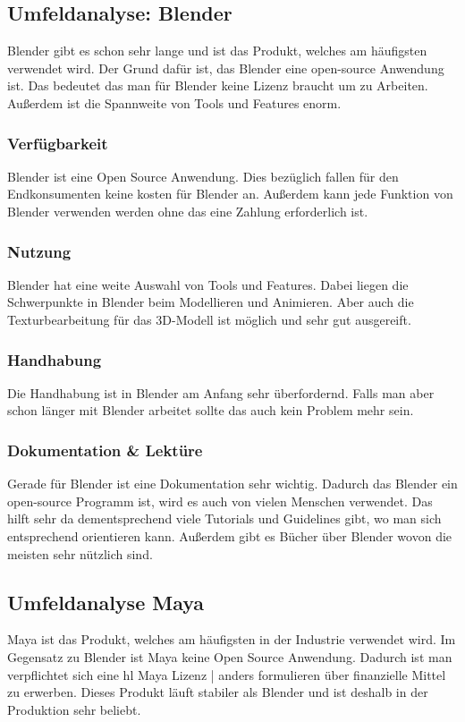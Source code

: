 \pagebreak

\subsection{Umfeldanalyse: Blender}
Blender gibt es schon sehr lange und ist das Produkt, welches am häufigsten verwendet wird. Der Grund dafür ist, das Blender eine open-source Anwendung ist. Das bedeutet das man für Blender keine Lizenz braucht um zu Arbeiten. Außerdem ist die Spannweite von Tools und Features enorm.




\subsubsection{Verfügbarkeit}
 Blender ist eine Open Source Anwendung. Dies bezüglich fallen für den Endkonsumenten keine kosten für Blender an. Außerdem kann jede Funktion von Blender verwenden werden ohne das eine Zahlung erforderlich ist.



\subsubsection{Nutzung}
Blender hat eine weite Auswahl von Tools und Features. Dabei liegen die Schwerpunkte in Blender beim Modellieren und Animieren. Aber auch die Texturbearbeitung für das 3D-Modell ist möglich und sehr gut ausgereift.

\subsubsection{Handhabung}
Die Handhabung ist in Blender am Anfang sehr überfordernd. Falls man aber schon länger mit Blender arbeitet sollte das auch kein Problem mehr sein.

\subsubsection{Dokumentation \& Lektüre}
Gerade für Blender ist eine Dokumentation sehr wichtig. Dadurch das Blender ein open-source Programm ist, wird es auch von vielen Menschen verwendet. Das hilft sehr da dementsprechend viele Tutorials und Guidelines gibt, wo man sich entsprechend orientieren kann. Außerdem gibt es Bücher über Blender wovon die meisten sehr nützlich sind.

\pagebreak

\subsection{Umfeldanalyse Maya}
Maya ist das Produkt, welches am häufigsten in der Industrie verwendet wird. Im Gegensatz zu Blender ist Maya keine Open Source Anwendung. Dadurch ist man verpflichtet sich eine hl  {Maya Lizenz | anders formulieren} über finanzielle Mittel zu erwerben. Dieses Produkt läuft stabiler als Blender und ist deshalb in der Produktion sehr beliebt.


